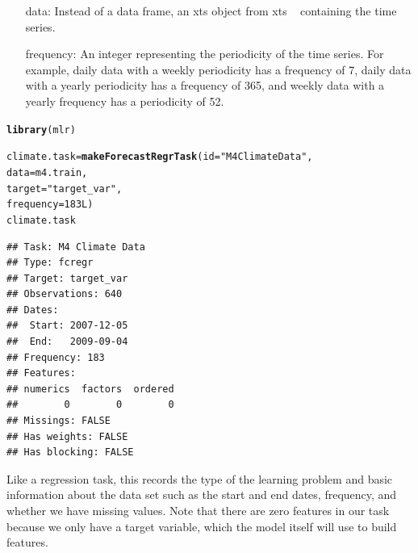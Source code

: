 \documentclass[12pt]{article}\usepackage[]{graphicx}\usepackage[]{color}
\makeatletter
\newcommand{\hlnum}[1]{\textcolor[rgb]{0.686,0.059,0.569}{#1}}%
\newcommand{\hlstr}[1]{\textcolor[rgb]{0.192,0.494,0.8}{#1}}%
\newcommand{\hlstd}[1]{\textcolor[rgb]{0.345,0.345,0.345}{#1}}%
\newcommand{\hlkwb}[1]{\textcolor[rgb]{0.69,0.353,0.396}{#1}}%
\newcommand{\hlkwc}[1]{\textcolor[rgb]{0.333,0.667,0.333}{#1}}%
\newcommand{\hlkwd}[1]{\textcolor[rgb]{0.737,0.353,0.396}{\textbf{#1}}}%
\newenvironment{kframe}{%
 \def\at@end@of@kframe{}%
 \ifinner\ifhmode%
  \def\at@end@of@kframe{\end{minipage}}%
  \begin{minipage}{\columnwidth}%
 \fi\fi%
 \def\FrameCommand##1{\hskip\@totalleftmargin \hskip-\fboxsep
 \colorbox{shadecolor}{##1}\hskip-\fboxsep
     \hskip-\linewidth \hskip-\@totalleftmargin \hskip\columnwidth}%
 \MakeFramed {\advance\hsize-\width
   \@totalleftmargin\z@ \linewidth\hsize
   \@setminipage}}%
 {\par\unskip\endMakeFramed%
 \at@end@of@kframe}
\newenvironment{knitrout}{}{} %
\theoremstyle{definition}
\newcommand{\pkg}[1]{{\fontseries{b}\selectfont #1}}
\makeatother
\begin{document}
\begin{itemize}
\item[data:] Instead of a data frame, an xts object from \pkg{xts} ~\cite{xts} containing the time series.
\item[frequency:] An integer representing the periodicity of the time series. For example, daily data with a weekly periodicity has a frequency of 7, daily data with a yearly periodicity has a frequency of 365, and weekly data with a yearly frequency has a periodicity of 52.
\end{itemize}

\singlespacing
\begin{knitrout}
\color{fgcolor}\begin{kframe}
\begin{alltt}
\hlkwd{library}\hlstd{(mlr)}

\hlstd{climate.task} \hlkwb{=} \hlkwd{makeForecastRegrTask}\hlstd{(}\hlkwc{id} \hlstd{=} \hlstr{"M4 Climate Data"}\hlstd{,}
                                 \hlkwc{data} \hlstd{= m4.train,}
                                 \hlkwc{target} \hlstd{=} \hlstr{"target_var"}\hlstd{,}
                                 \hlkwc{frequency} \hlstd{=} \hlnum{183L}\hlstd{)}
\hlstd{climate.task}
\end{alltt}
\begin{verbatim}
## Task: M4 Climate Data
## Type: fcregr
## Target: target_var
## Observations: 640
## Dates:
##  Start: 2007-12-05 
##  End:   2009-09-04
## Frequency: 183
## Features:
## numerics  factors  ordered 
##        0        0        0 
## Missings: FALSE
## Has weights: FALSE
## Has blocking: FALSE
\end{verbatim}
\end{kframe}
\end{knitrout}
\doublespacing
Like a regression task, this records the type of the learning problem and basic information about the data set such as the start and end dates, frequency, and whether we have missing values. Note that there are zero features in our task because we only have a target variable, which the model itself will use to build features.
\end{document}
